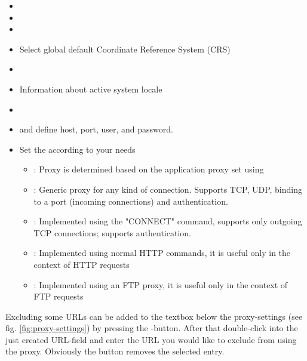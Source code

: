 
\begin{itemize}
\item {}
\item {}
\item {}
\item Select global default Coordinate Reference System (CRS)
\end{itemize}


\begin{itemize}
\item {}
\item Information about active system locale
\end{itemize}


\begin{itemize}
\item {}
\item {} and define host, port, user, and password.
\item Set the  according to your needs
 \begin{itemize}
  \item {}: Proxy is determined based on the application proxy set using
  \item {}: Generic proxy for any kind of connection. Supports TCP, UDP, binding to a port (incoming connections) and authentication.
  \item {}: Implemented using the "CONNECT" command, supports only outgoing TCP connections; supports authentication.
  \item {}: Implemented using normal HTTP commands, it is useful only in the context of HTTP requests
  \item {}: Implemented using an FTP proxy, it is useful only in the context of FTP requests
 \end{itemize}
\end{itemize}

Excluding some URLs can be added to the textbox below the proxy-settings (see
fig. \ref{fig:proxy-settings}) by pressing the -button. After that
double-click into the just created URL-field and enter the URL you would like
to exclude from using the proxy. Obviously the button  removes the selected
entry.

